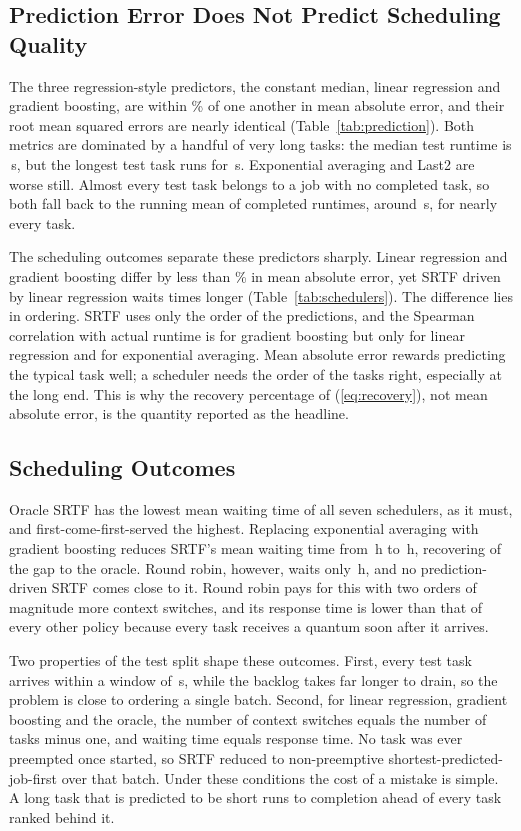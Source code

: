 \documentclass[conference]{IEEEtran}
\begin{document}
\subsection{Prediction Error Does Not Predict Scheduling Quality}
The three regression-style predictors, the constant median, linear
regression and gradient boosting, are within \maeSpreadPct\% of one another
in mean absolute error, and their root mean squared errors are nearly
identical (Table~\ref{tab:prediction}). Both metrics are dominated by a
handful of very long tasks: the median test runtime is \medianActual{}\,s,
but the longest test task runs for \maxActual{}\,s. Exponential averaging
and Last2 are worse still. Almost every test task belongs to a job with no
completed task, so both fall back to the running mean of completed runtimes,
around \meanExpAvgPred{}\,s, for nearly every task.

The scheduling outcomes separate these predictors sharply. Linear regression
and gradient boosting differ by less than \maeSpreadPct\% in mean absolute
error, yet SRTF driven by linear regression waits \ratioLinearGBM{} times
longer (Table~\ref{tab:schedulers}). The difference lies in ordering. SRTF
uses only the order of the predictions, and the Spearman correlation with
actual runtime is \spearmanGBM{} for gradient boosting but only
\spearmanLinear{} for linear regression and \spearmanExpAvg{} for
exponential averaging. Mean absolute error rewards predicting the typical
task well; a scheduler needs the order of the tasks right, especially at the
long end. This is why the recovery percentage of (\ref{eq:recovery}), not
mean absolute error, is the quantity reported as the headline.

\subsection{Scheduling Outcomes}
Oracle SRTF has the lowest mean waiting time of all seven schedulers, as it
must, and first-come-first-served the highest. Replacing exponential
averaging with gradient boosting reduces SRTF's mean waiting time from
\wExpAvg{}\,h to \wGBM{}\,h, recovering \headline{} of the gap to the
oracle. Round robin, however, waits only \wRR{}\,h, and no prediction-driven
SRTF comes close to it. Round robin pays for this with two orders of
magnitude more context switches, and its response time is lower than that
of every other policy because every task receives a quantum soon after it
arrives.

Two properties of the test split shape these outcomes. First, every test
task arrives within a window of \testWindow{}\,s, while the backlog takes
far longer to drain, so the problem is close to ordering a single batch.
Second, for linear regression, gradient boosting and the oracle, the number
of context switches equals the number of tasks minus one, and waiting time
equals response time. No task was ever preempted once started, so SRTF
reduced to non-preemptive shortest-predicted-job-first over that batch.
Under these conditions the cost of a mistake is simple. A long task that is
predicted to be short runs to completion ahead of every task ranked behind
it.
\end{document}
